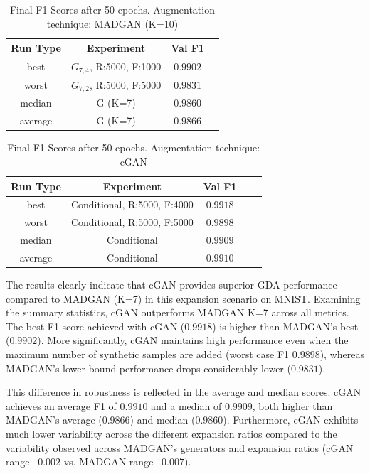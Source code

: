 \begin{table}[H]
	\vspace{-1.5em}
	\centering
	\begin{tabular}{|c|c|c|c|}
		\hline
		Run Type & Experiment & Val F1 \\ \hline
		best & \(G_{7, 4}\), R:5000, F:1000 & $0.9902$\\ \hline
		worst & \(G_{7, 2}\), R:5000, F:5000 & $0.9831$\\ \hline
		median & G (K=7) & $0.9860$\\ \hline
		average & G (K=7) & $0.9866$
		\\ \hline
	\end{tabular}
    \caption{Final F1 Scores after 50 epochs. Augmentation technique: MADGAN (K=10)}
        \label{tab:res_expansion_mnist_ccgan_vs_madgan__madgan}
\end{table}
\begin{table}[H]
	\centering
	\vspace{-1.5em}
	\begin{tabular}{|c|c|c|c|c|}
		\hline
		Run Type & Experiment & Val F1 \\ \hline
		best & Conditional, R:5000, F:4000 & $0.9918$\\ \hline
		worst & Conditional, R:5000, F:5000 & $0.9898$\\ \hline
		median & Conditional & $0.9909$\\ \hline
		average & Conditional & $0.9910$
		\\ \hline
	\end{tabular}
    \caption{Final F1 Scores after 50 epochs. Augmentation technique: cGAN}
        \label{tab:res_expansion_mnist_ccgan_vs_madgan__cgan}
\end{table}

The results clearly indicate that cGAN provides superior GDA performance compared to MADGAN (K=7) in this expansion scenario on MNIST. Examining the summary statistics, cGAN outperforms MADGAN K=7 across all metrics. The best F1 score achieved with cGAN ($0.9918$) is higher than MADGAN's best ($0.9902$). More significantly, cGAN maintains high performance even when the maximum number of synthetic samples are added (worst case F1 $0.9898$), whereas MADGAN's lower-bound performance drops considerably lower ($0.9831$).

This difference in robustness is reflected in the average and median scores. cGAN achieves an average F1 of $0.9910$ and a median of $0.9909$, both higher than MADGAN's average (0.9866) and median ($0.9860$). Furthermore, cGAN exhibits much lower variability across the different expansion ratios compared to the variability observed across MADGAN's generators and expansion ratios (cGAN range ~$0.002$ vs. MADGAN range ~$0.007$).

